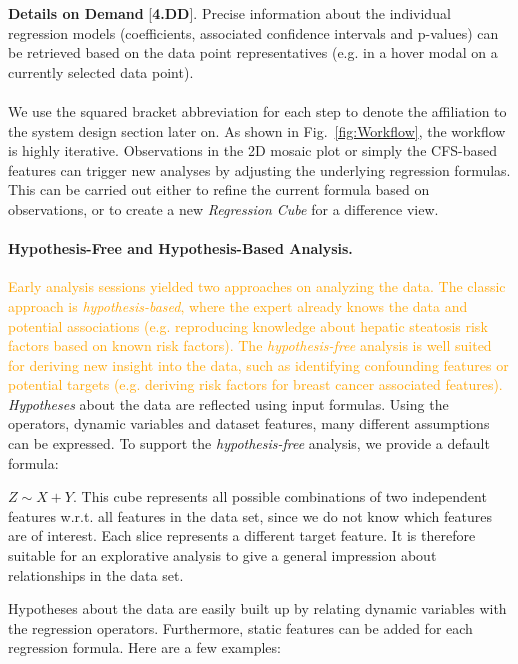 \documentclass[journal]{style/vgtc} 			          %
\newcommand{\design}[1]{\textcolor{orange}{#1}}
\begin{document}
\textbf{Details on Demand} [\textbf{4.DD}]. Precise information about the individual regression models (coefficients, associated confidence intervals and p-values) can be retrieved based on the data point representatives (e.g. in a hover modal on a currently selected data point).
\\\\
We use the squared bracket abbreviation for each step to denote the affiliation to the system design section later on.
As shown in Fig.~\ref{fig:Workflow}, the workflow is highly iterative.
Observations in the 2D mosaic plot or simply the CFS-based features can trigger new analyses by adjusting the underlying regression formulas.
This can be carried out either to refine the current formula based on observations, or to create a new \emph{Regression Cube} for a difference view.
\paragraph{Hypothesis-Free and Hypothesis-Based Analysis.}
\design{
Early analysis sessions yielded two approaches on analyzing the data.
The classic approach is \emph{hypothesis-based}, where the expert already knows the data and potential associations (e.g. reproducing knowledge about hepatic steatosis risk factors based on known risk factors).
The \emph{hypothesis-free} analysis is well suited for deriving new insight into the data, such as identifying confounding features or potential targets (e.g. deriving risk factors for breast cancer associated features).
}
\emph{Hypotheses} about the data are reflected using input formulas.
Using the operators, dynamic variables and dataset features, many different assumptions can be expressed.
To support the \emph{hypothesis-free} analysis, we provide a default formula:

$Z \sim X + Y$.
This cube represents all possible combinations of two independent features w.r.t. all features in the data set, since we do not know which features are of interest.
Each slice represents a different target feature.
It is therefore suitable for an explorative analysis to give a general impression about relationships in the data set.

Hypotheses about the data are easily built up by relating dynamic variables with the regression operators.
Furthermore, static features can be added for each regression formula.
Here are a few examples:
\end{document}
